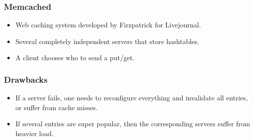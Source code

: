 \documentclass{beamer}
\begin{document}
    \begin{frame}
        \frametitle{Memcached}
        \begin{itemize}
            \item Web caching system developed by Firzpatrick for Livejournal.
            \item Several completely independent servers that store hashtables.
            \item A client chooses who to send a put/get.
        \end{itemize}
    \end{frame}
    \begin{frame}
        \frametitle{Drawbacks}
        \begin{itemize}
            \item If a server fails, one needs to reconfigure everything and invalidate
            all entries, or suffer from cache misses.
            \item If several entries are super popular, then the corresponding servers
            suffer from heavier load.
        \end{itemize}
    \end{frame}
\end{document}
